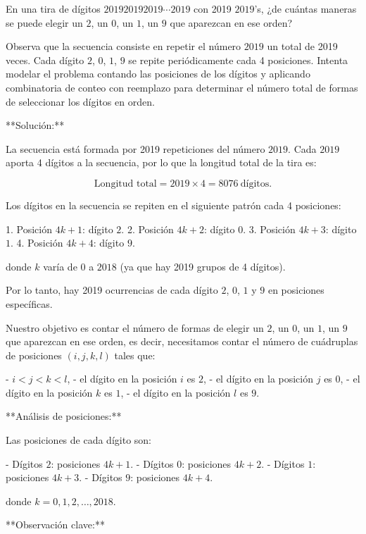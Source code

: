 \documentclass[11pt]{scrartcl}
\begin{document}
\begin{problem}
En una tira de dígitos $201920192019 \cdots 2019$ con 2019 $2019$'s, ¿de cuántas maneras se puede elegir un $2$, un $0$, un $1$, un $9$ que aparezcan en ese orden?

\begin{hint}
Observa que la secuencia consiste en repetir el número $2019$ un total de 2019 veces. Cada dígito $2$, $0$, $1$, $9$ se repite periódicamente cada 4 posiciones. Intenta modelar el problema contando las posiciones de los dígitos y aplicando combinatoria de conteo con reemplazo para determinar el número total de formas de seleccionar los dígitos en orden.
\end{hint}

\begin{solu}
**Solución:**

La secuencia está formada por 2019 repeticiones del número $2019$. Cada $2019$ aporta 4 dígitos a la secuencia, por lo que la longitud total de la tira es:

$$
\text{Longitud total} = 2019 \times 4 = 8076\ \text{dígitos}.
$$

Los dígitos en la secuencia se repiten en el siguiente patrón cada 4 posiciones:

1. Posición $4k + 1$: dígito $2$.
2. Posición $4k + 2$: dígito $0$.
3. Posición $4k + 3$: dígito $1$.
4. Posición $4k + 4$: dígito $9$.

donde $k$ varía de $0$ a $2018$ (ya que hay 2019 grupos de 4 dígitos).

Por lo tanto, hay 2019 ocurrencias de cada dígito $2$, $0$, $1$ y $9$ en posiciones específicas.

Nuestro objetivo es contar el número de formas de elegir un $2$, un $0$, un $1$, un $9$ que aparezcan en ese orden, es decir, necesitamos contar el número de cuádruplas de posiciones $(i, j, k, l)$ tales que:

- $i < j < k < l$,
- el dígito en la posición $i$ es $2$,
- el dígito en la posición $j$ es $0$,
- el dígito en la posición $k$ es $1$,
- el dígito en la posición $l$ es $9$.

**Análisis de posiciones:**

Las posiciones de cada dígito son:

- Dígitos $2$: posiciones $4k + 1$.
- Dígitos $0$: posiciones $4k + 2$.
- Dígitos $1$: posiciones $4k + 3$.
- Dígitos $9$: posiciones $4k + 4$.

donde $k = 0, 1, 2, \dots, 2018$.

**Observación clave:**


\end{solu}
\end{problem}
\end{document}

